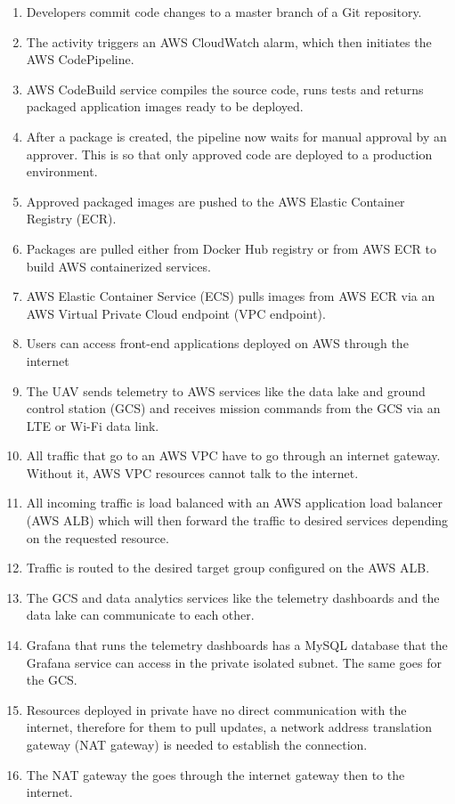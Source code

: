 \begin{enumerate}
    \item Developers commit code changes to a master branch of a Git repository.
    \item The activity triggers an AWS CloudWatch alarm, which then initiates the AWS CodePipeline.
    \item AWS CodeBuild service compiles the source code, runs tests and returns packaged application images ready to be deployed.
    \item After a package is created, the pipeline now waits for manual approval by an approver. This is so that only approved code are deployed to a production environment.
    \item Approved packaged images are pushed to the AWS Elastic Container Registry (ECR).
    \item Packages are pulled either from Docker Hub registry or from AWS ECR to build AWS containerized services.
    \item AWS Elastic Container Service (ECS) pulls images from AWS ECR via an AWS Virtual Private Cloud endpoint (VPC endpoint).
    \item Users can access front-end applications deployed on AWS through the internet
    \item The UAV sends telemetry to AWS services like the data lake and ground control station (GCS) and receives mission commands from the GCS via an LTE or Wi-Fi data link.
    \item All traffic that go to an AWS VPC have to go through an internet gateway. Without it, AWS VPC resources cannot talk to the internet.
    \item All incoming traffic is load balanced with an AWS application load balancer (AWS ALB) which will then forward the traffic to desired services depending on the requested resource.
    \item Traffic is routed to the desired target group configured on the AWS ALB.
    \item The GCS and data analytics services like the telemetry dashboards and the data lake can communicate to each other.
    \item Grafana that runs the telemetry dashboards has a MySQL database that the Grafana service can access in the private isolated subnet. The same goes for the GCS.
    \item Resources deployed in private have no direct communication with the internet, therefore for them to pull updates, a network address translation gateway (NAT gateway) is needed to establish the connection.
    \item The NAT gateway the goes through the internet gateway then to the internet.
\end{enumerate}


